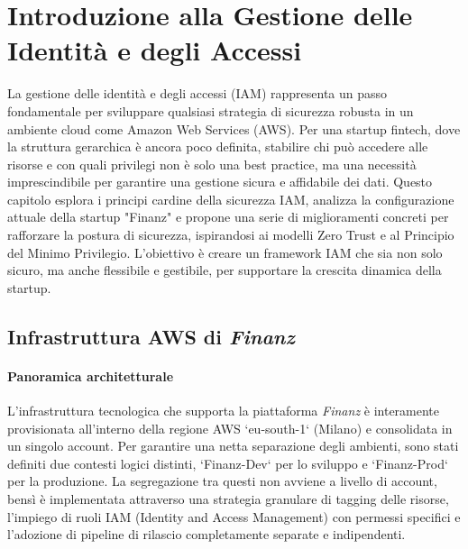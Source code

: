 \section{Introduzione alla Gestione delle Identità e degli Accessi}
La gestione delle identità e degli accessi (IAM) rappresenta un passo fondamentale per sviluppare qualsiasi strategia di sicurezza robusta in un ambiente cloud come Amazon Web Services (AWS). Per una startup fintech, dove la struttura gerarchica è ancora poco definita, stabilire chi può accedere alle risorse e con quali privilegi non è solo una best practice, ma una necessità imprescindibile per garantire una gestione sicura e affidabile dei dati. Questo capitolo esplora i principi cardine della sicurezza IAM, analizza la configurazione attuale della startup "Finanz" e propone una serie di miglioramenti concreti per rafforzare la postura di sicurezza, ispirandosi ai modelli Zero Trust e al Principio del Minimo Privilegio. L'obiettivo è creare un framework IAM che sia non solo sicuro, ma anche flessibile e gestibile, per supportare la crescita dinamica della startup.



\subsection{Infrastruttura AWS di \textit{Finanz}}
\label{subsec:aws_infrastruttura_attuale_cap4_narrativo}

\paragraph{Panoramica architetturale}
L'infrastruttura tecnologica che supporta la piattaforma \textit{Finanz} è interamente provisionata all'interno della regione AWS `eu-south-1` (Milano) e consolidata in un singolo account. Per garantire una netta separazione degli ambienti, sono stati definiti due contesti logici distinti, `Finanz-Dev` per lo sviluppo e `Finanz-Prod` per la produzione. La segregazione tra questi non avviene a livello di account, bensì è implementata attraverso una strategia granulare di tagging delle risorse, l'impiego di ruoli IAM (Identity and Access Management) con permessi specifici e l'adozione di pipeline di rilascio completamente separate e indipendenti.

